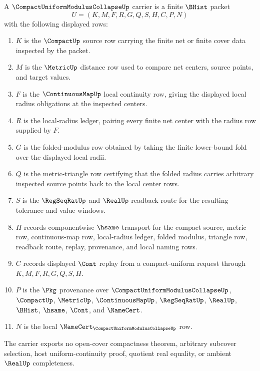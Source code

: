 \begin{definition}
\label{def:compact-uniform-modulus-collapse-carrier}
A $\CompactUniformModulusCollapseUp$ carrier is a finite $\BHist$ packet
$$
U=(K,M,F,R,G,Q,S,H,C,P,N)
$$
with the following displayed rows:
\begin{enumerate}
\item $K$ is the $\CompactUp$ source row carrying the finite net or finite cover data inspected by the packet.
\item $M$ is the $\MetricUp$ distance row used to compare net centers, source points, and target values.
\item $F$ is the $\ContinuousMapUp$ local continuity row, giving the displayed local radius obligations at the inspected centers.
\item $R$ is the local-radius ledger, pairing every finite net center with the radius row supplied by $F$.
\item $G$ is the folded-modulus row obtained by taking the finite lower-bound fold over the displayed local radii.
\item $Q$ is the metric-triangle row certifying that the folded radius carries arbitrary inspected source points back to the local center rows.
\item $S$ is the $\RegSeqRatUp$ and $\RealUp$ readback route for the resulting tolerance and value windows.
\item $H$ records componentwise $\hsame$ transport for the compact source, metric row, continuous-map row, local-radius ledger, folded modulus, triangle row, readback route, replay, provenance, and local naming rows.
\item $C$ records displayed $\Cont$ replay from a compact-uniform request through $K,M,F,R,G,Q,S,H$.
\item $P$ is the $\Pkg$ provenance over $\CompactUniformModulusCollapseUp$, $\CompactUp$, $\MetricUp$, $\ContinuousMapUp$, $\RegSeqRatUp$, $\RealUp$, $\BHist$, $\hsame$, $\Cont$, and $\NameCert$.
\item $N$ is the local $\NameCert_{\CompactUniformModulusCollapseUp}$ row.
\end{enumerate}
The carrier exports no open-cover compactness theorem, arbitrary subcover selection, host uniform-continuity proof, quotient real equality, or ambient $\RealUp$ completeness.
\end{definition}

